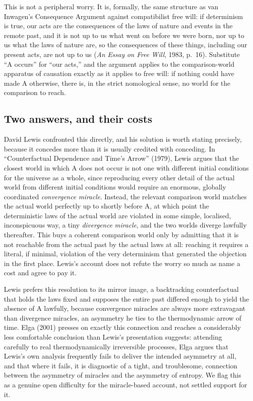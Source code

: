 \documentclass[11pt]{article}
\theoremstyle{definition}
\begin{document}
This is not a peripheral worry. It is, formally, the same structure as van Inwagen's Consequence Argument against compatibilist free will: if determinism is true, our acts are the consequences of the laws of nature and events in the remote past, and it is not up to us what went on before we were born, nor up to us what the laws of nature are, so the consequences of these things, including our present acts, are not up to us (\emph{An Essay on Free Will}, 1983, p.\ 16). Substitute ``A occurs'' for ``our acts,'' and the argument applies to the comparison-world apparatus of causation exactly as it applies to free will: if nothing could have made A otherwise, there is, in the strict nomological sense, no world for the comparison to reach.

\subsection{Two answers, and their costs}

David Lewis confronted this directly, and his solution is worth stating precisely, because it concedes more than it is usually credited with conceding. In ``Counterfactual Dependence and Time's Arrow'' (1979), Lewis argues that the closest world in which A does not occur is not one with different initial conditions for the universe as a whole, since reproducing every other detail of the actual world from different initial conditions would require an enormous, globally coordinated \emph{convergence miracle}. Instead, the relevant comparison world matches the actual world perfectly up to shortly before A, at which point the deterministic laws of the actual world are violated in some simple, localised, inconspicuous way, a tiny \emph{divergence miracle}, and the two worlds diverge lawfully thereafter. This buys a coherent comparison world only by admitting that it is not reachable from the actual past by the actual laws at all: reaching it requires a literal, if minimal, violation of the very determinism that generated the objection in the first place. Lewis's account does not refute the worry so much as name a cost and agree to pay it.

Lewis prefers this resolution to its mirror image, a backtracking counterfactual that holds the laws fixed and supposes the entire past differed enough to yield the absence of A lawfully, because convergence miracles are always more extravagant than divergence miracles, an asymmetry he ties to the thermodynamic arrow of time. Elga (2001) presses on exactly this connection and reaches a considerably less comfortable conclusion than Lewis's presentation suggests: attending carefully to real thermodynamically irreversible processes, Elga argues that Lewis's own analysis frequently fails to deliver the intended asymmetry at all, and that where it fails, it is diagnostic of a tight, and troublesome, connection between the asymmetry of miracles and the asymmetry of entropy. We flag this as a genuine open difficulty for the miracle-based account, not settled support for it.
\end{document}
